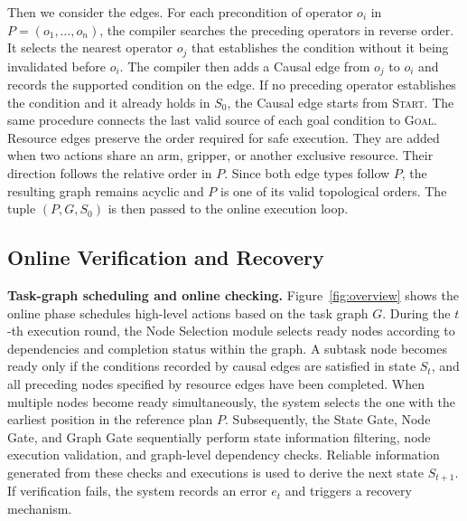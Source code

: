 \documentclass[letterpaper,10pt,conference]{ieeeconf}
\begin{document}
Then we consider the edges. For each precondition of operator $o_i$ in $P=(o_1,\ldots,o_n)$, the compiler searches the preceding operators in reverse order. It selects the nearest operator $o_j$ that establishes the condition without it being invalidated before $o_i$. The compiler then adds a Causal edge from $o_j$ to $o_i$ and records the supported condition on the edge. If no preceding operator establishes the condition and it already holds in $S_0$, the Causal edge starts from \textsc{Start}. The same procedure connects the last valid source of each goal condition to \textsc{Goal}. Resource edges preserve the order required for safe execution. They are added when two actions share an arm, gripper, or another exclusive resource. Their direction follows the relative order in $P$. Since both edge types follow $P$, the resulting graph remains acyclic and $P$ is one of its valid topological orders. The tuple $(P,G,S_0)$ is then passed to the online execution loop.




\subsection{Online Verification and Recovery}

\textbf{Task-graph scheduling and online checking.}
Figure~\ref{fig:overview} shows the online phase schedules high-level actions based on the task graph $G$. During the $t$-th execution round, the Node Selection module selects ready nodes according to dependencies and completion status within the graph. A subtask node becomes ready only if the conditions recorded by causal edges are satisfied in state $S_t$, and all preceding nodes specified by resource edges have been completed. When multiple nodes become ready simultaneously, the system selects the one with the earliest position in the reference plan $P$. Subsequently, the State Gate, Node Gate, and Graph Gate sequentially perform state information filtering, node execution validation, and graph-level dependency checks. Reliable information generated from these checks and executions is used to derive the next state $S_{t+1}$. If verification fails, the system records an error $e_t$ and triggers a recovery mechanism.
\end{document}
